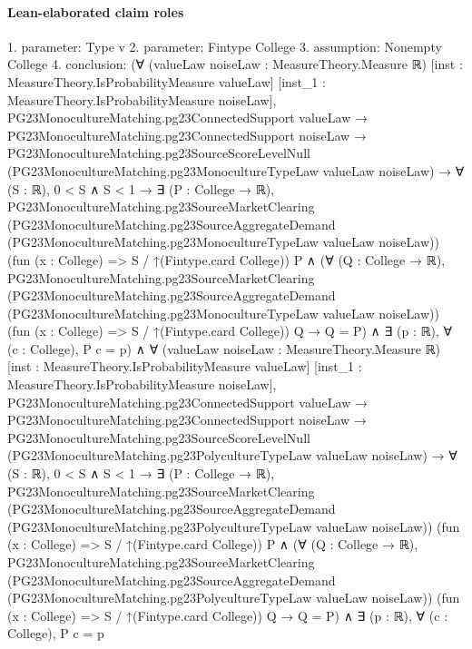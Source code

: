 \documentclass[10pt]{article}
\begin{document}
\paragraph{Lean-elaborated claim roles}\begin{ReviewVerbatim}
1. parameter: Type v
2. parameter: Fintype College
3. assumption: Nonempty College
4. conclusion: (∀ (valueLaw noiseLaw : MeasureTheory.Measure ℝ) [inst : MeasureTheory.IsProbabilityMeasure valueLaw]
    [inst_1 : MeasureTheory.IsProbabilityMeasure noiseLaw],
    PG23MonocultureMatching.pg23ConnectedSupport valueLaw →
      PG23MonocultureMatching.pg23ConnectedSupport noiseLaw →
        PG23MonocultureMatching.pg23SourceScoreLevelNull
            (PG23MonocultureMatching.pg23MonocultureTypeLaw valueLaw noiseLaw) →
          ∀ (S : ℝ),
            0 < S ∧ S < 1 →
              ∃ (P : College → ℝ),
                PG23MonocultureMatching.pg23SourceMarketClearing
                    (PG23MonocultureMatching.pg23SourceAggregateDemand
                      (PG23MonocultureMatching.pg23MonocultureTypeLaw valueLaw noiseLaw))
                    (fun (x : College) => S / ↑(Fintype.card College)) P ∧
                  (∀ (Q : College → ℝ),
                      PG23MonocultureMatching.pg23SourceMarketClearing
                          (PG23MonocultureMatching.pg23SourceAggregateDemand
                            (PG23MonocultureMatching.pg23MonocultureTypeLaw valueLaw noiseLaw))
                          (fun (x : College) => S / ↑(Fintype.card College)) Q →
                        Q = P) ∧
                    ∃ (p : ℝ), ∀ (c : College), P c = p) ∧
  ∀ (valueLaw noiseLaw : MeasureTheory.Measure ℝ) [inst : MeasureTheory.IsProbabilityMeasure valueLaw]
    [inst_1 : MeasureTheory.IsProbabilityMeasure noiseLaw],
    PG23MonocultureMatching.pg23ConnectedSupport valueLaw →
      PG23MonocultureMatching.pg23ConnectedSupport noiseLaw →
        PG23MonocultureMatching.pg23SourceScoreLevelNull
            (PG23MonocultureMatching.pg23PolycultureTypeLaw valueLaw noiseLaw) →
          ∀ (S : ℝ),
            0 < S ∧ S < 1 →
              ∃ (P : College → ℝ),
                PG23MonocultureMatching.pg23SourceMarketClearing
                    (PG23MonocultureMatching.pg23SourceAggregateDemand
                      (PG23MonocultureMatching.pg23PolycultureTypeLaw valueLaw noiseLaw))
                    (fun (x : College) => S / ↑(Fintype.card College)) P ∧
                  (∀ (Q : College → ℝ),
                      PG23MonocultureMatching.pg23SourceMarketClearing
                          (PG23MonocultureMatching.pg23SourceAggregateDemand
                            (PG23MonocultureMatching.pg23PolycultureTypeLaw valueLaw noiseLaw))
                          (fun (x : College) => S / ↑(Fintype.card College)) Q →
                        Q = P) ∧
                    ∃ (p : ℝ), ∀ (c : College), P c = p
\end{ReviewVerbatim}
\end{document}
